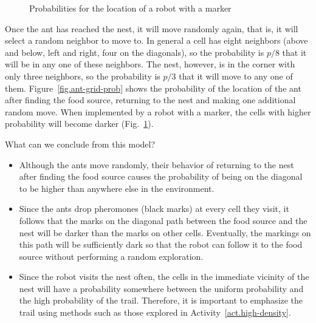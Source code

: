 \begin{figure}
\begin{center}
\end{center}
\caption{Probabilities for the location of a robot with a marker}\label{fig.ant-grid-gray}
\end{figure}

Once the ant has reached the nest, it will move randomly again, that is, it will select a random neighbor to move to. In general a cell has eight neighbors (above and below, left and right, four on the diagonals), so the probability is $p/8$ that it will be in any one of these neighbors. The nest, however, is in the corner with only three neighbors, so the probability is $p/3$ that it will move to any one of them. Figure~\ref{fig.ant-grid-prob} shows the probability of the location of the ant after finding the food source, returning to the nest and making one additional random move. When implemented by a robot with a marker, the cells with higher probability will become darker (Fig.~\ref{fig.ant-grid-gray}).

What can we conclude from this model?
\begin{itemize}
\item Although the ants move randomly, their behavior of returning to the nest after finding the food source causes the probability of being on the diagonal to be higher than anywhere else in the environment. 
\item Since the ants drop pheromones (black marks) at every cell they visit, it follows that the marks on the diagonal path between the food source and the nest will be darker than the marks on other cells. Eventually, the markings on this path will be sufficiently dark so that the robot can follow it to the food source without performing a random exploration.
\item Since the robot visits the nest often, the cells in the immediate vicinity of the nest will have a probability somewhere between the uniform probability and the high probability of the trail. Therefore, it is important to emphasize the trail using methods such as those explored in Activity~\ref{act.high-density}.
\end{itemize}

